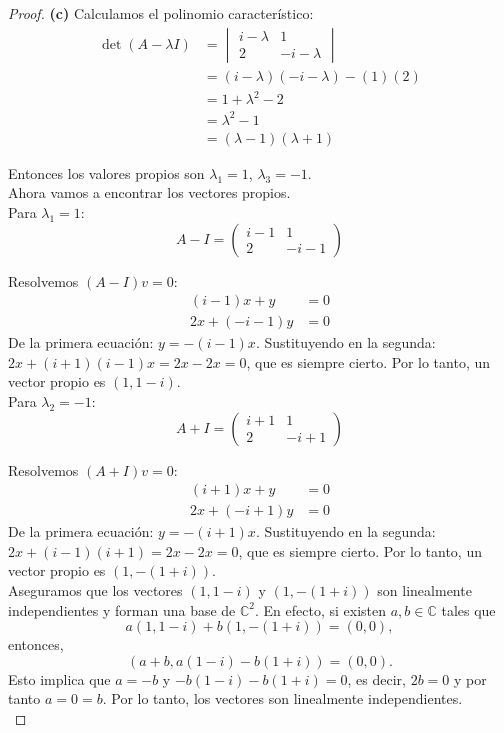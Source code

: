 \documentclass[11pt]{article}
\newcommand{\C}{\mathbb{C}}
\begin{document}
\begin{proof}
\textbf{(c)}
Calculamos el polinomio característico:
\begin{align*}
\det(A - \lambda I) &= \begin{vmatrix} i-\lambda & 1 \\ 2 & -i-\lambda \end{vmatrix} \\ &= (i-\lambda)(-i-\lambda) - (1)(2) \\
&= 1 + \lambda^2 - 2 \\ &= \lambda^2 - 1 \\ &= (\lambda - 1)(\lambda + 1)
\end{align*}


Entonces los valores propios son  $\lambda_1 = 1$, $\lambda_3 = -1$. \\[10pt]

Ahora vamos a encontrar los vectores propios.\\[10pt]

Para $\lambda_1 = 1$:
\[
A - I = \begin{pmatrix} i-1 & 1 \\ 2 & -i-1 \end{pmatrix}
\]

Resolvemos $(A - I)v = 0$:
\begin{align*}
    (i-1)x +y &=0\\ 2x+ (-i-1)y &=0
\end{align*}
De la primera ecuación: $y = -(i-1)x$. Sustituyendo en la segunda: \( 2x +(i+1)(i-1)x = 2x-2x =0\), que es siempre cierto. Por lo tanto, un vector propio es 
$( 1, 1-i )$.\\

Para $\lambda_2 = -1$:
\[
A + I = \begin{pmatrix} i+1 & 1 \\ 2 & -i+1 \end{pmatrix}
\]

Resolvemos $(A + I)v=0$:
\begin{align*}
    (i+1)x +y &=0\\ 2x+ (-i+1)y &=0
\end{align*}
De la primera ecuación: $y = -(i+1)x$. Sustituyendo en la segunda: \( 2x+(i-1)(i+1)= 2x -2x=0\), que es siempre cierto. Por lo tanto, un vector propio es 
$( 1, -(1+i))$.\\

Aseguramos que los vectores $(1, 1-i )$ y $(1, -(1+i)) $ son linealmente independientes y forman una base de $\C^2$. En efecto, si existen $a,b \in \C$ tales que
\[
    a(1, 1-i ) + b(1, -(1+i)) = (0,0),
\]
entonces, 
\[(a + b, a(1-i) - b(1+i)) = (0,0).\]
Esto implica que \(a=-b\) y \( -b(1-i)-b(1+i)=0\), es decir, \(2b=0\) y por tanto \(a=0=b\). Por lo tanto, los vectores son linealmente independientes. \\[10pt]


\end{proof}
\end{document}

